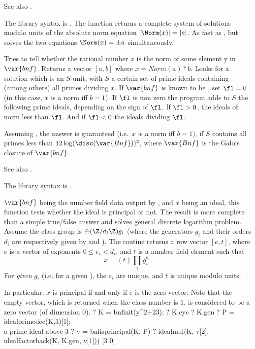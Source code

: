 See also .

The library syntax is .
The function 
returns a complete system of solutions modulo units of the absolute norm
equation $|\Norm(x)| = |a|$. As fast as , but solves
the two equations $\Norm(x) = \pm a$ simultaneously.

\label{se:bnfisnorm}
Tries to tell whether the
rational number $x$ is the norm of some element y in $\var{bnf}$. Returns a
vector $[a,b]$ where $x=Norm(a)*b$. Looks for a solution which is an $S$-unit,
with $S$ a certain set of prime ideals containing (among others) all primes
dividing $x$. If $\var{bnf}$ is known to be , set $\fl=0$ (in
this case, $x$ is a norm iff $b=1$). If $\fl$ is non zero the program adds to
$S$ the following prime ideals, depending on the sign of $\fl$. If $\fl>0$,
the ideals of norm less than $\fl$. And if $\fl<0$ the ideals dividing $\fl$.

Assuming , the answer is guaranteed (i.e.~$x$ is a norm iff $b=1$),
if $S$ contains all primes less than $12\log(\disc(\var{Bnf}))^2$, where
$\var{Bnf}$ is the Galois closure of $\var{bnf}$.

See also .

The library syntax is .

\label{se:bnfisprincipal}
$\var{bnf}$ being the 
number field data output by , and $x$ being an ideal, this
function tests whether the ideal is principal or not. The result is more
complete than a simple true/false answer and solves general discrete
logarithm problem. Assume the class group is $\oplus (\Z/d_i\Z)g_i$
(where the generators $g_i$ and their orders $d_i$ are respectively given by
 and ). The routine returns a row vector $[e,t]$,
where $e$ is a vector of exponents $0 \leq e_i < d_i$, and $t$ is a number
field element such that
$$ x = (t) \prod_i  g_i^{e_i}.$$
For \emph{given} $g_i$ (i.e. for a given ), the $e_i$ are unique,
and $t$ is unique modulo units.

In particular, $x$ is principal if and only if $e$ is the zero vector. Note
that the empty vector, which is returned when the class number is $1$, is
considered to be a zero vector (of dimension $0$).
\bprog
? K = bnfinit(y^2+23);
? K.cyc
? K.gen
? P = idealprimedec(K,3)[1]; \\ a prime ideal above 3
? v = bnfisprincipal(K, P)
? idealmul(K, v[2], idealfactorback(K, K.gen, v[1]))
[3 0]

